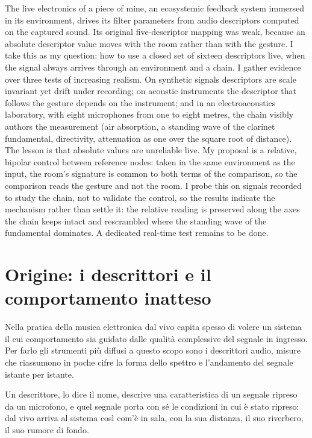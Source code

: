 \documentclass{article}
\title{\papertitle}
\begin{document}
%
\maketitle

\abstract
The live electronics of a piece of mine, an ecosystemic feedback system immersed in its environment, drives its filter parameters from audio descriptors computed on the captured sound. Its original five-descriptor mapping was weak, because an absolute descriptor value moves with the room rather than with the gesture. I take this as my question: how to use a closed set of sixteen descriptors live, when the signal always arrives through an environment and a chain. I gather evidence over three tests of increasing realism. On synthetic signals descriptors are scale invariant yet drift under recording; on acoustic instruments the descriptor that follows the gesture depends on the instrument; and in an electroacoustics laboratory, with eight microphones from one to eight metres, the chain visibly authors the measurement (air absorption, a standing wave of the clarinet fundamental, directivity, attenuation as one over the square root of distance). The lesson is that absolute values are unreliable live. My proposal is a relative, bipolar control between reference nodes: taken in the same environment as the input, the room's signature is common to both terms of the comparison, so the comparison reads the gesture and not the room. I probe this on signals recorded to study the chain, not to validate the control, so the results indicate the mechanism rather than settle it: the relative reading is preserved along the axes the chain keeps intact and rescrambled where the standing wave of the fundamental dominates. A dedicated real-time test remains to be done.
\endabstract
{}

\section{Origine: i descrittori e il comportamento inatteso}\label{sec:origine}

Nella pratica della musica elettronica dal vivo capita spesso di volere un sistema il cui comportamento sia guidato dalle qualità complessive del segnale in ingresso. Per farlo gli strumenti più diffusi a questo scopo sono i descrittori audio, misure che riassumono in poche cifre la forma dello spettro e l'andamento del segnale istante per istante.

Un descrittore, lo dice il nome, descrive una caratteristica di un segnale ripreso da un microfono, e quel segnale porta con sé le condizioni in cui è stato ripreso: dal vivo arriva al sistema così com'è in sala, con la sua distanza, il suo riverbero, il suo rumore di fondo.
\end{document}

